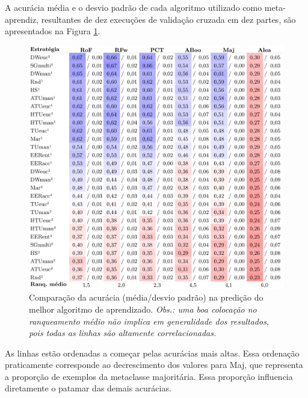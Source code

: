 A acurácia média e o desvio padrão de cada algoritmo utilizado como meta-aprendiz, resultantes de dez execuções de validação cruzada em dez partes, são apresentados na Figura \ref{accmeta}.
\begin{figure}
\centering
\includegraphics[scale=0.4]{images/metaacc.pdf}
\caption[Comparação da acurácia na predição do melhor algoritmo de aprendizado.]{Comparação da acurácia (média/desvio padrão) na predição do melhor algoritmo de aprendizado.
\textit{Obs.: uma boa colocação no ranqueamento médio não implica em generalidade dos resultados, pois todas as linhas são altamente correlacionadas.}}
\label{accmeta}
\end{figure}
As linhas estão ordenadas a começar pelas acurácias mais altas.
Essa ordenação praticamente corresponde ao decrescimento dos valores para Maj, que representa a proporção de exemplos da metaclasse majoritária. Essa proporção influencia diretamente o patamar das demais acurácias.


